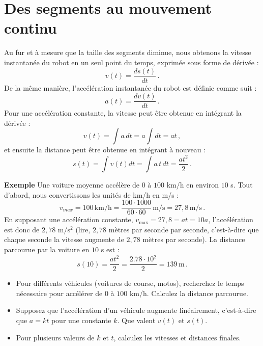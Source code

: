 {\section{Des segments au mouvement continu}\label{s.continuous}

Au fur et à mesure que la taille des segments diminue, nous obtenons la vitesse instantanée du robot en un seul point du temps, exprimée sous forme de dérivée :
\[v(t) = \frac{ds(t)}{dt}\,.\]
De la même manière, l'accélération instantanée du robot est définie comme suit :
\[a(t) = \frac{dv(t)}{dt}\,.\]
Pour une accélération constante, la vitesse peut être obtenue en intégrant la dérivée :
\[v(t) = \int a\, dt = a\int {dt} = at\,,\]
et ensuite la distance peut être obtenue en intégrant à nouveau :
\[s(t) = \int v(t) dt=\int a\,t\,dt = \frac{at^2}{2}\,.\]

\noindent{}\textbf{Exemple} Une voiture moyenne accélère de $0$ à $100$ km/h en environ $10$ s. Tout d'abord, nous convertissons les unités de km/h en m/s :
\[
v_{\textit{max}} = 100\, \textrm{km/h} = \frac{100\cdot 1000}{60\cdot 60} \,\textrm{m/s} = 27,8 \,\textrm{m/s}\,.
\]
En supposant une accélération constante, $v_{\textrm{max}} = 27,8 = at = 10a$, l'accélération est donc de $2,78$ m/s$^{2}$ (lire, $2,78$ mètres par seconde par seconde, c'est-à-dire que chaque seconde la vitesse augmente de $2,78$ mètres par seconde). La distance parcourue par la voiture en $10$ s est :
\[s(10) = \frac{at^2}{2} = \frac{2.78\cdot 10^2}{2}= 139 \,\textrm{m}\,.\]

\begin{framed}
\begin{itemize}
\item Pour différents véhicules (voitures de course, motos), recherchez le temps nécessaire pour accélérer de $0$ à $100$ km/h. Calculez la distance parcourue.
\item Supposez que l'accélération d'un véhicule augmente linéairement, c'est-à-dire que $a=kt$ pour une constante $k$. Que valent $v(t)$ et $s(t)$.
\item Pour plusieurs valeurs de $k$ et $t$, calculez les vitesses et distances finales.
\end{itemize}
\end{framed}

}
